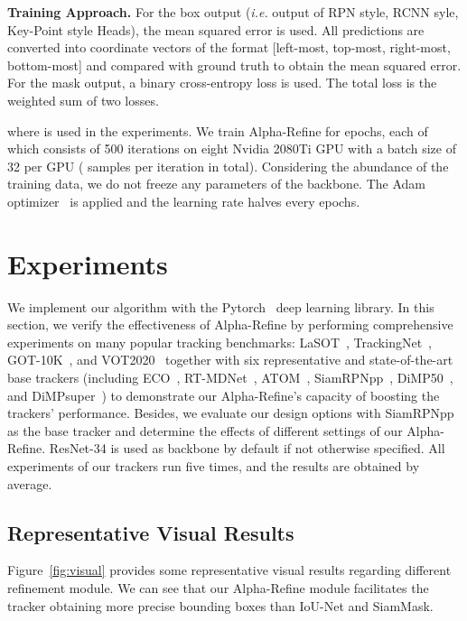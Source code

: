 \documentclass[final]{cvpr}
\begin{document}
{\noindent \textbf{Training Approach.}} 
For the box output (\emph{i.e.} output of RPN style, RCNN syle, Key-Point style Heads), 
the mean squared error  is used. 
All predictions are converted into coordinate vectors of the format 
[left-most, top-most, right-most, bottom-most] 
and compared with ground truth to obtain the mean squared error.
For the mask output, a binary cross-entropy loss  is used.
The total loss  is the weighted sum of two losses.

where  is used in the experiments. 
We train Alpha-Refine for  epochs, each of which consists of 500 iterations 
on eight Nvidia 2080Ti GPU with a batch size of 32 per GPU ( samples 
per iteration in total). 
Considering the abundance of the training data, we do not freeze any parameters of the backbone. 
The Adam optimizer~\cite{Adam} is applied and the learning rate halves every  epochs. 

\section{Experiments}\label{sec:experiment}
We implement our algorithm with the Pytorch~\cite{pytorch} deep learning library.
In this section, we verify the effectiveness of Alpha-Refine by performing comprehensive 
experiments on many popular tracking benchmarks: LaSOT~\cite{LaSOT}, TrackingNet~\cite{Trackingnet}, GOT-10K~\cite{GOT10K}, 
and VOT2020~\cite{VOT2020} together with six representative and state-of-the-art base trackers (including ECO~\cite{ECO}, 
RT-MDNet~\cite{RTMDNet}, ATOM~\cite{ATOM}, SiamRPNpp~\cite{SiamRPNplus}, DiMP50~\cite{DiMP}, and DiMPsuper~\cite{DiMP}) 
to demonstrate our Alpha-Refine's capacity of boosting the trackers' performance. 
Besides, we evaluate our design options with SiamRPNpp~\cite{SiamRPNplus} as the base tracker and 
determine the effects of different settings of our Alpha-Refine.
ResNet-34 is used as backbone by default if not otherwise specified. 
All experiments of our trackers run five times, and the results are obtained by average. 

\subsection{Representative Visual Results}
Figure~\ref{fig:visual} provides some representative visual results regarding different refinement 
module. We can see that our Alpha-Refine module facilitates the tracker obtaining more precise bounding 
boxes than IoU-Net and SiamMask.   
\vspace{-2mm}
\end{document}
